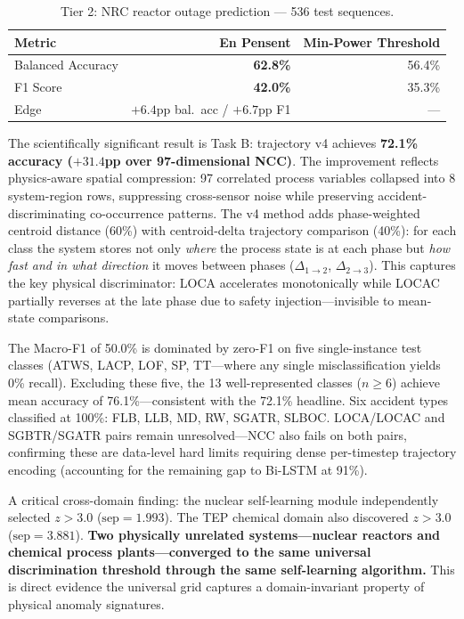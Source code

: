 \documentclass[12pt,a4paper]{article}
\begin{document}
\begin{table}[H]
\centering
\caption{Tier 2: NRC reactor outage prediction --- 536 test sequences.}
\label{tab:nrc}
\begin{tabular}{lrr}
\toprule
\textbf{Metric} & \textbf{En Pensent} & \textbf{Min-Power Threshold} \\
\midrule
Balanced Accuracy & \textbf{62.8\%} & 56.4\% \\
F1 Score          & \textbf{42.0\%} & 35.3\% \\
Edge              & $+6.4$pp bal.\ acc / $+6.7$pp F1 & --- \\
\bottomrule
\end{tabular}
\end{table}

The scientifically significant result is Task B: trajectory v4 achieves \textbf{72.1\% accuracy
($+31.4$pp over 97-dimensional NCC)}. The improvement reflects physics-aware spatial compression:
97 correlated process variables collapsed into 8 system-region rows, suppressing cross-sensor noise
while preserving accident-discriminating co-occurrence patterns. The v4 method adds phase-weighted
centroid distance (60\%) with centroid-delta trajectory comparison (40\%): for each class the
system stores not only \emph{where} the process state is at each phase but \emph{how fast and in
what direction} it moves between phases ($\Delta_{1\to2}$, $\Delta_{2\to3}$). This captures the
key physical discriminator: LOCA accelerates monotonically while LOCAC partially reverses at the
late phase due to safety injection---invisible to mean-state comparisons.

The Macro-F1 of 50.0\% is dominated by zero-F1 on five single-instance test classes (ATWS, LACP,
LOF, SP, TT---where any single misclassification yields 0\% recall). Excluding these five, the 13
well-represented classes ($n{\geq}6$) achieve mean accuracy of 76.1\%---consistent with the 72.1\%
headline. Six accident types classified at 100\%: FLB, LLB, MD, RW, SGATR, SLBOC. LOCA/LOCAC and
SGBTR/SGATR pairs remain unresolved---NCC also fails on both pairs, confirming these are data-level
hard limits requiring dense per-timestep trajectory encoding (accounting for the remaining gap to
Bi-LSTM at 91\%).

A critical cross-domain finding: the nuclear self-learning module independently selected $z{>}3.0$
($\text{sep}{=}1.993$). The TEP chemical domain also discovered $z{>}3.0$ ($\text{sep}{=}3.881$).
\textbf{Two physically unrelated systems---nuclear reactors and chemical process plants---converged
to the same universal discrimination threshold through the same self-learning algorithm.} This is
direct evidence the universal grid captures a domain-invariant property of physical anomaly
signatures.
\end{document}
